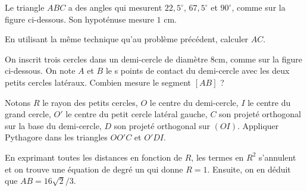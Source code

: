 \begin{exo}
Le triangle $ABC$ a des angles qui mesurent $22,5^\circ$, $67,5^\circ$ et $90^\circ$, comme sur la figure ci-dessous. Son hypoténuse mesure $1$ cm. 

En utilisant la même technique qu'au problème précédent, calculer $AC$.

\begin{center}
\end{center}
\end{exo}



\begin{exo}
On inscrit trois cercles dans un demi-cercle de diamètre $8$cm, comme sur la figure ci-dessous. 
On note $A$ et $B$ le s points de contact du demi-cercle avec les deux petits cercles latéraux.
Combien mesure le segment $[AB]$ ?
\begin{center}
\end{center}
\begin{hint}
Notons $R$ le rayon des petits cercles, $O$ le centre du demi-cercle, $I$ le centre du grand cercle, $O'$ le centre du petit cercle latéral gauche, $C$ son projeté orthogonal sur la base du demi-cercle, $D$ son projeté orthogonal sur $(OI)$.
Appliquer Pythagore dans les triangles $OO'C$ et $O'DI$.
\end{hint}
\begin{sol}
En exprimant toutes les distances en fonction de $R$, les termes en $R^2$ s'annulent et on trouve une équation de degré un qui donne $R=1$.
Ensuite, on en déduit que $AB=16\sqrt 2 / 3$.

\end{sol}
\end{exo}



